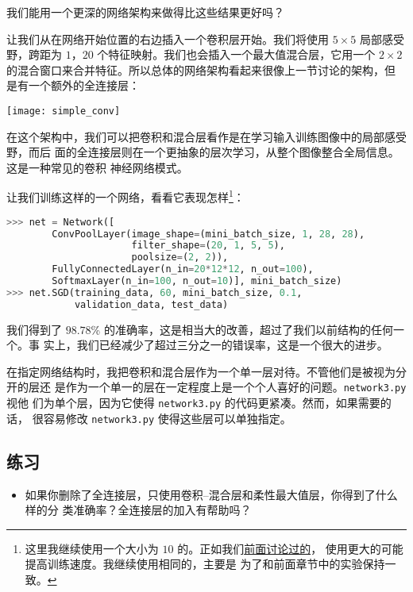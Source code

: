 我们能用一个更深的网络架构来做得比这些结果更好吗？

让我们从在网络开始位置的右边插入一个卷积层开始。我们将使用 $5 \times 5$ 局部感受
野，跨距为 $1$，$20$ 个特征映射。我们也会插入一个最大值混合层，它用一个 $2
\times 2$ 的混合窗口来合并特征。所以总体的网络架构看起来很像上一节讨论的架构，但
是有一个额外的全连接层：
\begin{center}
  \texttt{[image: simple\_conv]}  
\end{center}

在这个架构中，我们可以把卷积和混合层看作是在学习输入训练图像中的局部感受野，而后
面的全连接层则在一个更抽象的层次学习，从整个图像整合全局信息。这是一种常见的卷积
神经网络模式。

让我们训练这样的一个网络，看看它表现怎样\footnote{这里我继续使用一个大小为 
$10$ 的\minibatch{}。正如我们\hyperref[mini_batch_size]{前面讨论过的}，
使用更大的\minibatch{}可能提高训练速度。我继续使用相同的\minibatch{}，主要是
为了和前面章节中的实验保持一致。}：
\begin{lstlisting}[language=Python]
>>> net = Network([
        ConvPoolLayer(image_shape=(mini_batch_size, 1, 28, 28), 
                      filter_shape=(20, 1, 5, 5), 
                      poolsize=(2, 2)),
        FullyConnectedLayer(n_in=20*12*12, n_out=100),
        SoftmaxLayer(n_in=100, n_out=10)], mini_batch_size)
>>> net.SGD(training_data, 60, mini_batch_size, 0.1, 
            validation_data, test_data)
\end{lstlisting}

我们得到了 $98.78$\% 的准确率，这是相当大的改善，超过了我们以前结构的任何一个。事
实上，我们已经减少了超过三分之一的错误率，这是一个很大的进步。

在指定网络结构时，我把卷积和混合层作为一个单一层对待。不管他们是被视为分开的层还
是作为一个单一的层在一定程度上是一个个人喜好的问题。\lstinline!network3.py! 视他
们为单个层，因为它使得 \lstinline!network3.py! 的代码更紧凑。然而，如果需要的话，
很容易修改 \lstinline!network3.py! 使得这些层可以单独指定。

\subsection*{练习}

\begin{itemize}
\item 如果你删除了全连接层，只使用卷积--混合层和柔性最大值层，你得到了什么样的分
  类准确率？全连接层的加入有帮助吗？
\end{itemize}

